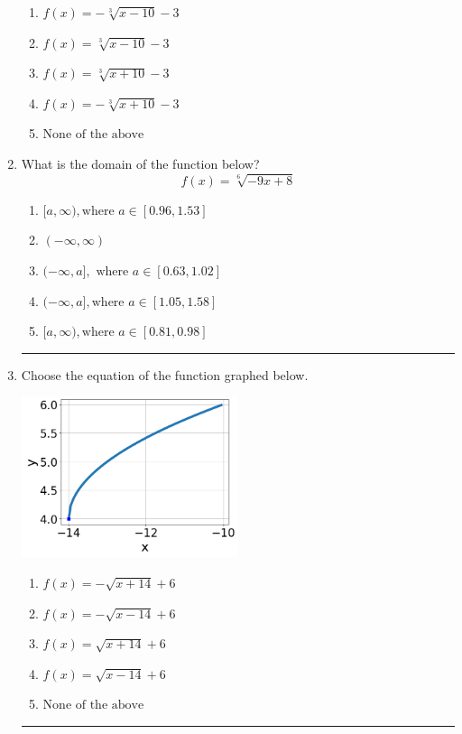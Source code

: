 \documentclass[14pt]{extbook}
\newcommand{\litem}[1]{\item#1\hspace*{-1cm}\rule{\textwidth}{0.4pt}}
\begin{document}
\begin{enumerate}
{\begin{center}
\end{center}
\begin{enumerate}[label=\Alph*.]
\item \( f(x) = - \sqrt[3]{x - 10} - 3 \)
\item \( f(x) = \sqrt[3]{x - 10} - 3 \)
\item \( f(x) = \sqrt[3]{x + 10} - 3 \)
\item \( f(x) = - \sqrt[3]{x + 10} - 3 \)
\item \( \text{None of the above} \)

\end{enumerate} }
\litem{
What is the domain of the function below?\[ f(x) = \sqrt[6]{-9 x + 8} \]\begin{enumerate}[label=\Alph*.]
\item \( [a, \infty), \text{where } a \in [0.96, 1.53] \)
\item \( (-\infty, \infty) \)
\item \( (-\infty, a], \text{ where } a \in [0.63, 1.02] \)
\item \( (-\infty, a], \text{where } a \in [1.05, 1.58] \)
\item \( [a, \infty), \text{where } a \in [0.81, 0.98] \)

\end{enumerate} }
\litem{
Choose the equation of the function graphed below.
\begin{center}
    \includegraphics[width=0.5\textwidth]{../Figures/radicalGraphToEquationC.png}
\end{center}
\begin{enumerate}[label=\Alph*.]
\item \( f(x) = - \sqrt{x + 14} + 6 \)
\item \( f(x) = - \sqrt{x - 14} + 6 \)
\item \( f(x) = \sqrt{x + 14} + 6 \)
\item \( f(x) = \sqrt{x - 14} + 6 \)
\item \( \text{None of the above} \)


\end{enumerate}}
\end{enumerate}
\end{document}
